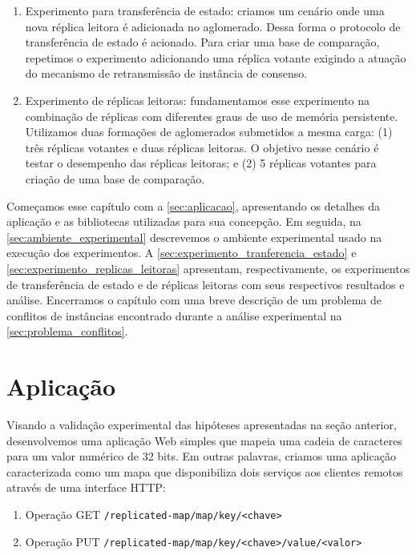 \begin{enumerate}
  \item Experimento para transferência de estado: criamos um cenário onde uma nova réplica
    leitora é adicionada no aglomerado. Dessa forma o protocolo de transferência de estado
    é acionado. Para criar uma base de comparação, repetimos o experimento adicionando uma
    réplica votante exigindo a atuação do mecanismo de retransmissão de instância de
    consenso.
  \item Experimento de réplicas leitoras: fundamentamos esse experimento na combinação de
    réplicas com diferentes graus de uso de memória persistente. Utilizamos duas formações
    de aglomerados submetidos a mesma carga: (1) três réplicas votantes e duas réplicas
    leitoras. O objetivo nesse cenário é testar o desempenho das réplicas leitoras; e (2)
    5 réplicas votantes para criação de uma base de comparação.
\end{enumerate}

Começamos esse capítulo com a \autoref{sec:aplicacao}, apresentando os detalhes da
aplicação e as bibliotecas utilizadas para sua concepção. Em seguida, na
\autoref{sec:ambiente_experimental} descrevemos o ambiente experimental usado na execução
dos experimentos. A \autoref{sec:experimento_tranferencia_estado} e
\autoref{sec:experimento_replicas_leitoras} apresentam, respectivamente, os experimentos de
transferência de estado e de réplicas leitoras com seus respectivos resultados e análise.
Encerramos o capítulo com uma breve descrição de um problema de conflitos de instâncias
encontrado durante a análise experimental na \autoref{sec:problema_conflitos}.


\section{Aplicação}\label{sec:aplicacao}

Visando a validação experimental das hipóteses apresentadas na seção anterior,
desenvolvemos uma aplicação Web simples que mapeia uma cadeia de caracteres para um valor
numérico de 32 bits. Em outras palavras, criamos uma aplicação caracterizada como um mapa
que disponibiliza dois serviços aos clientes remotos através de uma interface HTTP:

\begin{enumerate}
  \item Operação GET \verb|/replicated-map/map/key/<chave>|
  \item Operação PUT \verb|/replicated-map/map/key/<chave>/value/<valor>|
\end{enumerate}

